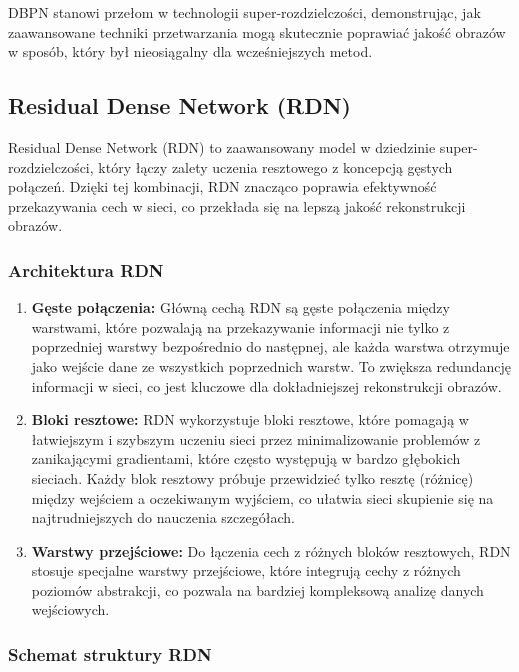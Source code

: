 \documentclass[10pt]{article}
\begin{document}
DBPN stanowi przełom w technologii super-rozdzielczości, demonstrując, jak zaawansowane techniki przetwarzania mogą skutecznie poprawiać jakość obrazów w sposób, który był nieosiągalny dla wcześniejszych metod.

\subsection*{Residual Dense Network (RDN)}

Residual Dense Network (RDN) to zaawansowany model w dziedzinie super-rozdzielczości, który łączy zalety uczenia resztowego z koncepcją gęstych połączeń. Dzięki tej kombinacji, RDN znacząco poprawia efektywność przekazywania cech w sieci, co przekłada się na lepszą jakość rekonstrukcji obrazów.

\subsubsection*{Architektura RDN}

\begin{enumerate}
    \item \textbf{Gęste połączenia:} Główną cechą RDN są gęste połączenia między warstwami, które pozwalają na przekazywanie informacji nie tylko z poprzedniej warstwy bezpośrednio do następnej, ale każda warstwa otrzymuje jako wejście dane ze wszystkich poprzednich warstw. To zwiększa redundancję informacji w sieci, co jest kluczowe dla dokładniejszej rekonstrukcji obrazów.
    \item \textbf{Bloki resztowe:} RDN wykorzystuje bloki resztowe, które pomagają w łatwiejszym i szybszym uczeniu sieci przez minimalizowanie problemów z zanikającymi gradientami, które często występują w bardzo głębokich sieciach. Każdy blok resztowy próbuje przewidzieć tylko resztę (różnicę) między wejściem a oczekiwanym wyjściem, co ułatwia sieci skupienie się na najtrudniejszych do nauczenia szczegółach.
    \item \textbf{Warstwy przejściowe:} Do łączenia cech z różnych bloków resztowych, RDN stosuje specjalne warstwy przejściowe, które integrują cechy z różnych poziomów abstrakcji, co pozwala na bardziej kompleksową analizę danych wejściowych.
\end{enumerate}

\subsubsection*{Schemat struktury RDN}
\end{document}
